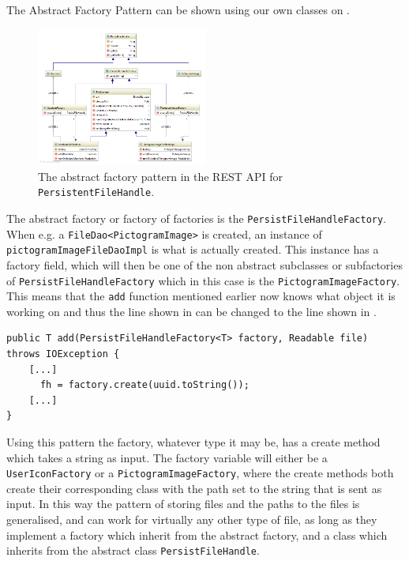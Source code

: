 The Abstract Factory Pattern can be shown using our own classes on .

\begin{figure}[h]
    \centering
    \includegraphics[width=0.5\textwidth]{figures/diagram-factory.png}
    \caption{The abstract factory pattern in the REST API for \texttt{PersistentFileHandle}.}\label{fig:asbtractFactory}
\end{figure}
The abstract factory or factory of factories is the \texttt{PersistFileHandleFactory}.
When e.g. a \texttt{FileDao<PictogramImage>} is created, an instance of \texttt{pictogramImageFileDaoImpl} is what is actually created.
This instance has a factory field, which will then be one of the non abstract subclasses or subfactories of \texttt{PersistFileHandleFactory} which in this case is the \texttt{PictogramImageFactory}.
This means that the \texttt{add} function mentioned earlier now knows what object it is working on and thus the line shown in  can be changed to the line shown in .

\begin{lstlisting}[float, floatplacement=h, caption={Trying to use a Type Parameter constructor, which Java cannot do. \texttt{[...]} denotes omitted code.},label={lst:TypeParameterConstructorActual}]
public T add(PersistFileHandleFactory<T> factory, Readable file) throws IOException {
    [...]
      fh = factory.create(uuid.toString());
    [...]
}
\end{lstlisting}

Using this pattern the factory, whatever type it may be, has a create method which takes a string as input.
The factory variable will either be a \texttt{UserIconFactory} or a \texttt{PictogramImageFactory}, where the create methods both create their corresponding class with the path set to the string that is sent as input.
In this way the pattern of storing files and the paths to the files is generalised, and can work for virtually any other type of file, as long as they implement a factory which inherit from the abstract factory, and a class which inherits from the abstract class \texttt{PersistFileHandle}.


